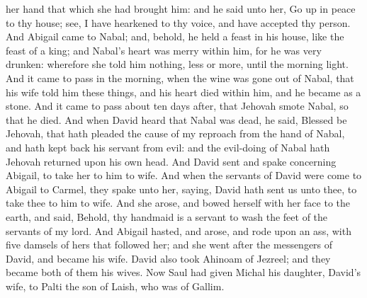 her hand that which she had brought him: and he said unto her, Go up in peace to thy house; see, I have hearkened to thy voice, and have accepted thy person.  And Abigail came to Nabal; and, behold, he held a feast in his house, like the feast of a king; and Nabal’s heart was merry within him, for he was very drunken: wherefore she told him nothing, less or more, until the morning light. And it came to pass in the morning, when the wine was gone out of Nabal, that his wife told him these things, and his heart died within him, and he became as a stone. And it came to pass about ten days after, that Jehovah smote Nabal, so that he died.  And when David heard that Nabal was dead, he said, Blessed be Jehovah, that hath pleaded the cause of my reproach from the hand of Nabal, and hath kept back his servant from evil: and the evil-doing of Nabal hath Jehovah returned upon his own head. And David sent and spake concerning Abigail, to take her to him to wife. And when the servants of David were come to Abigail to Carmel, they spake unto her, saying, David hath sent us unto thee, to take thee to him to wife. And she arose, and bowed herself with her face to the earth, and said, Behold, thy handmaid is a servant to wash the feet of the servants of my lord. And Abigail hasted, and arose, and rode upon an ass, with five damsels of hers that followed her; and she went after the messengers of David, and became his wife.  David also took Ahinoam of Jezreel; and they became both of them his wives. Now Saul had given Michal his daughter, David’s wife, to Palti the son of Laish, who was of Gallim. 

